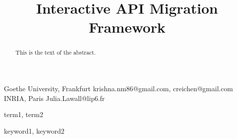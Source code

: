 \documentclass[preprint]{sigplanconf}
\begin{document}
\setlength{\pdfpageheight}{\paperheight}
\setlength{\pdfpagewidth}{\paperwidth}



\titlebanner{}        %
\preprintfooter{}   %

\title{Interactive API Migration Framework}
\subtitle{}

           {Goethe University, Frankfurt}
           {krishna.nm86@gmail.com, creichen@gmail.com}
           {INRIA, Paris}
           {Julia.Lawall@lip6.fr}

\maketitle

\begin{abstract}
This is the text of the abstract.
\end{abstract}


\terms
term1, term2

\keywords
keyword1, keyword2
\end{document}
